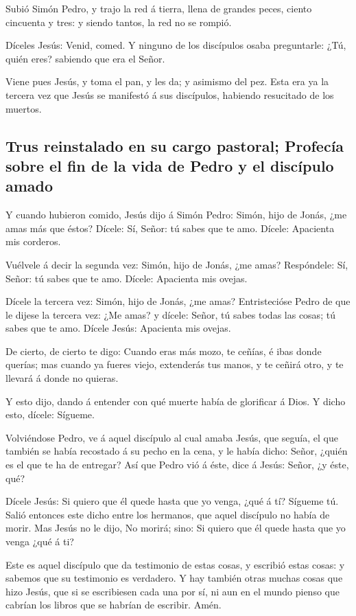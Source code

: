  Subió Simón Pedro, y trajo la red á tierra, llena de
grandes peces, ciento cincuenta y tres: y siendo tantos, la red no se
rompió.

 Díceles Jesús: Venid, comed. Y ninguno de los discípulos
osaba preguntarle: ¿Tú, quién eres? sabiendo que era el Señor.

 Viene pues Jesús, y toma el pan, y les da; y asimismo del
pez.  Esta era ya la tercera vez que Jesús se manifestó á
sus discípulos, habiendo resucitado de los muertos.

\hypertarget{trus-reinstalado-en-su-cargo-pastoral-profecuxeda-sobre-el-fin-de-la-vida-de-pedro-y-el-discuxedpulo-amado}{%
\subsection{Trus reinstalado en su cargo pastoral; Profecía sobre el fin
de la vida de Pedro y el discípulo
amado}\label{trus-reinstalado-en-su-cargo-pastoral-profecuxeda-sobre-el-fin-de-la-vida-de-pedro-y-el-discuxedpulo-amado}}

 Y cuando hubieron comido, Jesús dijo á Simón Pedro: Simón,
hijo de Jonás, ¿me amas más que éstos? Dícele: Sí, Señor: tú sabes que
te amo. Dícele: Apacienta mis corderos.

 Vuélvele á decir la segunda vez: Simón, hijo de Jonás, ¿me
amas? Respóndele: Sí, Señor: tú sabes que te amo. Dícele: Apacienta mis
ovejas.

 Dícele la tercera vez: Simón, hijo de Jonás, ¿me amas?
Entristecióse Pedro de que le dijese la tercera vez: ¿Me amas? y dícele:
Señor, tú sabes todas las cosas; tú sabes que te amo. Dícele Jesús:
Apacienta mis ovejas.

 De cierto, de cierto te digo: Cuando eras más mozo, te
ceñías, é ibas donde querías; mas cuando ya fueres viejo, extenderás tus
manos, y te ceñirá otro, y te llevará á donde no quieras.

 Y esto dijo, dando á entender con qué muerte había de
glorificar á Dios. Y dicho esto, dícele: Sígueme.

 Volviéndose Pedro, ve á aquel discípulo al cual amaba
Jesús, que seguía, el que también se había recostado á su pecho en la
cena, y le había dicho: Señor, ¿quién es el que te ha de entregar?
 Así que Pedro vió á éste, dice á Jesús: Señor, ¿y éste,
qué?

 Dícele Jesús: Si quiero que él quede hasta que yo venga,
¿qué á tí? Sígueme tú.  Salió entonces este dicho entre los
hermanos, que aquel discípulo no había de morir. Mas Jesús no le dijo,
No morirá; sino: Si quiero que él quede hasta que yo venga ¿qué á ti?

 Este es aquel discípulo que da testimonio de estas cosas,
y escribió estas cosas: y sabemos que su testimonio es verdadero.
 Y hay también otras muchas cosas que hizo Jesús, que si se
escribiesen cada una por sí, ni aun en el mundo pienso que cabrían los
libros que se habrían de escribir. Amén.
